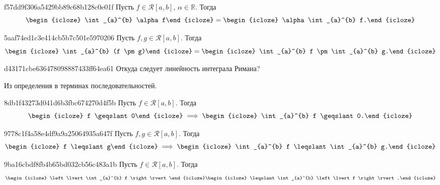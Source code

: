 \begin{note}{f57dd9f306a5429bb89c68b128c0e01f}
    Пусть \({ f \in \mathcal R[a, b] }\), \({ \alpha \in \mathbb R }\).
    Тогда
    \[
        \begin{icloze}{2}\int_{a}^{b} \alpha f\end{icloze} = \begin{icloze}{1}\alpha \int_{a}^{b} f.\end{icloze}
    \]
\end{note}

\begin{note}{5aaf74ed1c3e414cb5b7c501e5970206}
    Пусть \({ f, g \in \mathcal R[a, b] }\).
    Тогда
    \[
        \begin{icloze}{2}\int_{a}^{b} (f \pm g)\end{icloze} = \begin{icloze}{1}\int_{a}^{b} f \pm \int_{a}^{b} g.\end{icloze}
    \]
\end{note}

\begin{note}{d43171cbe636478098887433ff64ea61}
    Откуда следует линейность интеграла Римана?

    \begin{cloze}{1}
        Из определения в терминах последовательностей.
    \end{cloze}
\end{note}

\begin{note}{8db1f43273d041d6b3fbc674270d4f5b}
    Пусть \({ f \in \mathcal R[a, b] }\).
    Тогда
    \[
        \begin{icloze}{2}f \geqslant 0\end{icloze} \implies \begin{icloze}{1}\int_{a}^{b} f \geqslant 0.\end{icloze}
    \]
\end{note}

\begin{note}{9778c1f4a58e4df9a9a25064935a647f}
    Пусть \({ f, g \in \mathcal R[a, b] }\).
    Тогда
    \[
        \begin{icloze}{2}f \leqslant g\end{icloze} \implies \begin{icloze}{1}\int_{a}^{b} f \leqslant \int_{a}^{b} g.\end{icloze}
    \]
\end{note}

\begin{note}{9ba16cbdf8fb4b65bd032cb56c483a1b}
    Пусть \({ f \in \mathcal R[a, b] }\).
    Тогда
    \[
        \begin{icloze}{2}\left\lvert \int_{a}^{b} f \right\rvert\end{icloze} \begin{icloze}{1}\leqslant \int_{a}^{b} \left\lvert f \right\rvert.\end{icloze}
    \]
\end{note}

